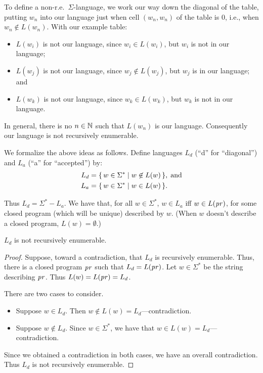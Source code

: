 To define a non-r.e.\ $\Sigma$-language, we work our way down the diagonal of
the table, putting $w_n$ into our language just when cell $(w_n,w_n)$
of the table is $0$, i.e., when $w_n\not\in L(w_n)$.
With our example table:
\begin{itemize}
\item $L(w_i)$ is not our language, since $w_i\in L(w_i)$, but $w_i$
  is not in our language;

\item $L(w_j)$ is not our language, since $w_j\not\in L(w_j)$, but
  $w_j$ is in our language; and

\item $L(w_k)$ is not our language, since $w_k\in L(w_k)$, but $w_k$
  is not in our language.
\end{itemize}
In general, there is no $n\in\mathbb{N}$ such that $L(w_n)$ is our
language.  Consequently our language is not recursively enumerable.

We formalize the above ideas as follows.  Define languages
%
%
%
%
$L_d$ (``d'' for ``diagonal'') and $L_a$ (``a'' for ``accepted'') by:
\begin{align*}
L_d &= \{ \, w\in\Sigma^* \mid w\not\in L(w) \, \} , \;\allowbreak\mbox{and}\allowbreak \\
L_a &= \{ \, w\in\Sigma^* \mid w\in L(w) \, \} .
\end{align*}

Thus $L_d = \Sigma^* - L_a$.  We have that, for all $w\in\Sigma^*$,
$w\in L_a$ iff $w\in L(\mathit{pr})$, for some closed program (which will be
unique) described by $w$. (When $w$ doesn't describe a closed program,
$L(w)=\emptyset$.)

\begin{theorem}
$L_d$ is not recursively enumerable.
\end{theorem}

\begin{proof}
Suppose, toward a contradiction, that $L_d$ is recursively
enumerable.  Thus, there is a closed program $\mathit{pr}$ such that
$L_d=L(\mathit{pr})$.  Let $w\in\Sigma^*$ be the string describing $\mathit{pr}$.
Thus $L(w)=L(\mathit{pr})=L_d$.

There are two cases to consider.
\begin{itemize}
\item Suppose $w\in L_d$.  Then $w\not\in L(w)=L_d$---contradiction.

\item Suppose $w\not\in L_d$.  Since $w\in\Sigma^*$, we have that
  $w\in L(w)=L_d$---contradiction.
\end{itemize}
Since we obtained a contradiction in both cases, we have an
overall contradiction.  Thus $L_d$ is not recursively enumerable.
\end{proof}

